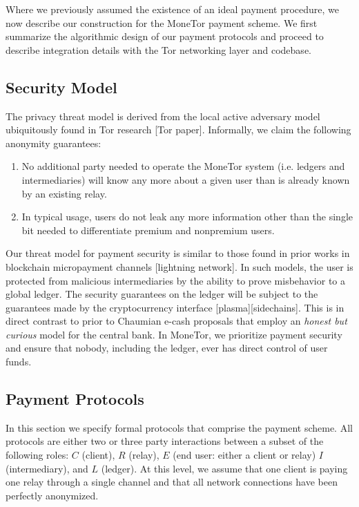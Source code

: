 Where we previously assumed the existence of an ideal payment procedure, we now
describe our construction for the MoneTor payment scheme. We first summarize the
algorithmic design of our payment protocols and proceed to describe integration
details with the Tor networking layer and codebase.

\subsection{Security Model}

The privacy threat model is derived from the local active adversary
model ubiquitously found in Tor research [Tor paper]. Informally, we claim the following
anonymity guarantees:

\begin{enumerate}
\item No additional party needed to operate the MoneTor system (i.e. ledgers
  and intermediaries) will know any more about a given user than is already
  known by an existing relay.
\item In typical usage, users do not leak any more information other than the
  single bit needed to differentiate premium and nonpremium users.
\end{enumerate}

Our threat model for payment security is similar to those found in prior works
in blockchain micropayment channels [lightning network]. In such models, the
user is protected from malicious intermediaries by the ability to prove
misbehavior to a global ledger. The security guarantees on the ledger will be
subject to the guarantees made by the cryptocurrency interface
[plasma][sidechains]. This is in direct contrast to prior to Chaumian e-cash
proposals that employ an \emph{honest but curious} model for the central
bank. In MoneTor, we prioritize payment security and ensure that nobody,
including the ledger, ever has direct control of user funds.

\subsection{Payment Protocols}

In this section we specify formal protocols that comprise the payment
scheme. All protocols are either two or three party interactions between a
subset of the following roles: $C$ (client), $R$ (relay), $E$ (end user: either
a client or relay) $I$ (intermediary), and $L$ (ledger). At this level, we assume that
one client is paying one relay through a single channel and that all network
connections have been perfectly anonymized.

